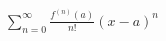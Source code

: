 \documentclass[preview]{standalone}
\begin{document}
\begin{align*}
\sum_{n=0}^{\infty} \frac{f^{(n)}(a)}{n!} (x-a)^n
\end{align*}
\end{document}
